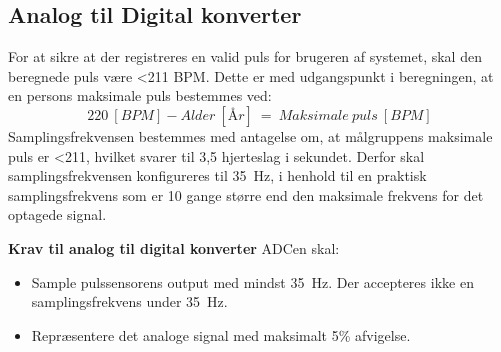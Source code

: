 \subsection{Analog til Digital konverter} \label{krav_adc}
For at sikre at der registreres en valid puls for brugeren af systemet, skal den beregnede puls være <211 BPM. Dette er med udgangspunkt i beregningen, at en persons maksimale puls bestemmes ved: \citep{CooperBlair2005} 
\begin{equation}
220~[BPM] - Alder~[\text{Å}r]~=~Maksimale~puls~[BPM]
\end{equation}
Samplingsfrekvensen bestemmes med antagelse om, at målgruppens maksimale puls er <211, hvilket svarer til 3,5 hjerteslag i sekundet. Derfor skal samplingsfrekvensen konfigureres til 35~Hz, i henhold til en praktisk samplingsfrekvens som er 10 gange større end den maksimale frekvens for det optagede signal. \citep{Webster2011}

\textbf{Krav til analog til digital konverter} \newline
ADCen skal:
\begin{itemize}
	\item Sample pulssensorens output med mindst 35~Hz. Der accepteres ikke en samplingsfrekvens under 35~Hz. 
	\item Repræsentere det analoge signal med maksimalt 5\% afvigelse. 
\end{itemize}

